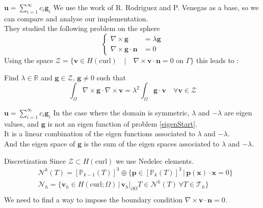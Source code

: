 \documentclass{beamer}
\newcommand{\R}{{\mathbb{R}}}
\newcommand{\Z}{{\bm{\mathcal{Z}}}}
\newcommand{\PP}{{\mathbb{P}}}
\newcommand{\TT}{{\bm{\mathcal{T}}}}
\newcommand{\NN}{{\bm{\mathcal{N}}}}
\newcommand{\curl}{{\nabla\times}}
\newcommand{\restr}{{\big\rvert_{\partial\Omega}}}
\begin{document}
\begin{frame}{$\mathbf{u}=\sum_{i=1}^\infty c_i\mathbf{g}_i$}
  We use the work of R. Rodriguez and P. Venegas \cite{Venegas2013} as a base, so we can compare and analyse our implementation.\\
  They studied the following problem on the sphere
  \begin{equation}\label{eigenStart}
    \left\{
    \begin{aligned}
      \curl\mathbf{g}&=\lambda\mathbf{g}\\
      \curl\mathbf{g}\cdot\mathbf{n}&=0
    \end{aligned}
    \right.
  \end{equation}
  Using the space $\Z=\{\mathbf{v}\in H(\mathrm{curl}) \quad|\quad \curl\mathbf{v}\cdot\mathbf{n} = 0 \mbox{ on } \Gamma\}$ this leads to :
  \begin{block}{Find $\lambda\in\R$ and $\mathbf{g}\in \Z$, $\mathbf{g}\neq 0$ such that}
    \begin{equation}\label{eigenwf}
      \int_\Omega \curl\mathbf{g}\cdot\curl\mathbf{v} = \lambda^2\int_\Omega \mathbf{g}\cdot\mathbf{v} \quad \forall\mathbf{v}\in \Z
    \end{equation}
    \end{block}
\end{frame}

\begin{frame}{$\mathbf{u}=\sum_{i=1}^\infty c_i\mathbf{g}_i$}
  In the case where the domain is symmetric, $\lambda$ and $-\lambda$ are eigen values, and $\mathbf{g}$ is not an eigen function of problem \ref{eigenStart}.\\
  It is a linear combination of the eigen functions associated to $\lambda$ and $-\lambda$.\\
  And the eigen space of $\mathbf{g}$ is the sum of the eigen spaces associated to $\lambda$ and $-\lambda$.
  \begin{block}{Discretization}
    Since $\Z\subset H(\mathrm{curl})$ we use Nedelec elements.\\
    \begin{align*}
      &\NN^k(T)=[\PP_{k-1}(T)]^3\oplus\{\mathbf{p}\in[\PP_k(T)]^3 \,|\,
      \mathbf{p(x)}\cdot\mathbf{x}=0 \}\\
      &\NN_h=\{\mathbf{v}_h\in H(\mathrm{curl};\Omega) \,|\,
      \mathbf{v}_h\restr{T}\in\NN^k(T)\, \forall T\in \TT_h \}\\
    \end{align*}
    We need to find a way to impose the boundary condition $\curl\mathbf{v}\cdot\mathbf{n}=0$.
  \end{block}
\end{frame}
\end{document}
